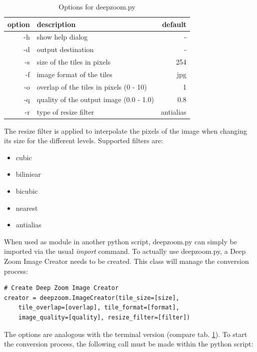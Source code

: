 \begin{table}[H]
	\begin{center}
		\begin{tabular}{| r | l | r |}
			\hline
			\textbf{option} & \textbf{description} & \textbf{default} \\ \hline
			-h & show help dialog & - \\ \hline
			-d & output destination & - \\ \hline
			-s & size of the tiles in pixels & 254 \\ \hline
			-f & image format of the tiles & jpg\\ \hline
			-o & overlap of the tiles in pixels (0 - 10) & 1 \\ \hline
			-q & quality of the output image (0.0 - 1.0) & 0.8 \\ \hline
			-r & type of resize filter & antialias \\ \hline
		\end{tabular}
		\caption{Options for deepzoom.py}
		\label{tab3_deepzoomParams}
	\end{center}
\end{table}

The resize filter is applied to interpolate the pixels of the image when changing its size for the different levels. Supported filters are:

\begin{itemize}
	\item cubic
	\item biliniear
	\item bicubic
	\item nearest
	\item antialias
\end{itemize}

When used as module in another python script, deepzoom.py can simply be imported via the usual \emph{import} command. To actually use deepzoom.py, a Deep Zoom Image Creator needs to be created. This class will manage the conversion process:

\begin{lstlisting}[frame=single]
# Create Deep Zoom Image Creator
creator = deepzoom.ImageCreator(tile_size=[size], 
	tile_overlap=[overlap],	tile_format=[format], 
	image_quality=[quality], resize_filter=[filter])
\end{lstlisting}

The options are analogous with the terminal version (compare tab. \ref{tab3_deepzoomParams}). To start the conversion process, the following call must be made within the python script:

